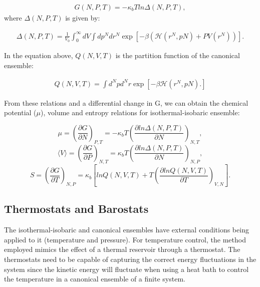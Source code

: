 \begin{equation}
\label{eq:fisobari}
\begin{aligned}
G(N,P,T) = -\kappa_{b}T ln \Delta (N,P,T),
\end{aligned}
\end{equation}
where $\Delta (N,P,T)$ is given by: 

\begin{equation}
\begin{aligned}
\Delta (N,P,T) = \frac{1}{V_{0}} \int_{0}^{\infty} dV \int d p^{N} d r^{N} \exp \left[ -\beta \left( \mathcal{H} (r^{N},p{N}) + PV(r^{N}) \right) \right] .
\end{aligned}
\end{equation}

In the equation above, $Q (N,V,T)$ is the partition function of the canonical ensemble:

\begin{equation}
\begin{aligned}
Q(N,V,T) = \int d^{N}p d^{N}r \exp \left[ -\beta \mathcal{H} (r^{N},p{N}) .
\right]
\end{aligned}
\end{equation}

From these relations and a differential change in G, we can obtain the chemical potential ($\mu$), volume and entropy relations for isothermal-isobaric ensemble:

\begin{equation}
\mu = \left (\frac{\partial G}{\partial N} \right)_{P,T} = - \kappa_{b} T \left(\frac{\partial ln \Delta (N,P,T)}{\partial N} \right)_{N,T},
\end{equation}  
\begin{equation}
\langle V \rangle= \left (\frac{\partial G}{\partial P} \right)_{N,T}= \kappa_{b} T \left (\frac{\partial ln \Delta (N,P,T)}{\partial N} \right)_{N,P},
\end{equation}
\begin{equation}
S = \left (\frac{\partial G}{\partial T} \right)_{N,P}= \kappa_{b}  \left[ln Q(N,V,T)+ T \left (\frac{\partial ln Q (N,V,T)}{\partial T} \right)_{V,N}\right] .
\end{equation}

\subsection{Thermostats and Barostats}

The isothermal-isobaric and canonical ensembles have external conditions being applied to it (temperature and pressure). For temperature control, the method employed mimics the effect of a thermal reservoir through a thermostat. The thermostats need to be capable of capturing the correct energy fluctuations in the system since the kinetic energy will fluctuate when using a heat bath to control the temperature in a canonical ensemble of a finite system.  

